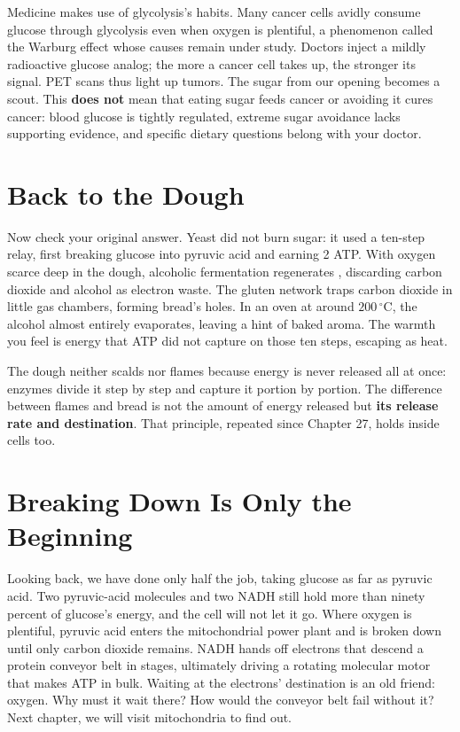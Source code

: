 Medicine makes use of glycolysis's habits. Many cancer cells avidly consume glucose through glycolysis even when oxygen is plentiful, a phenomenon called the Warburg effect whose causes remain under study. Doctors inject a mildly radioactive glucose analog; the more a cancer cell takes up, the stronger its signal. PET scans thus light up tumors. The sugar from our opening becomes a scout. This \textbf{does not} mean that eating sugar feeds cancer or avoiding it cures cancer: blood glucose is tightly regulated, extreme sugar avoidance lacks supporting evidence, and specific dietary questions belong with your doctor.

\section{Back to the Dough}

Now check your original answer. Yeast did not burn sugar: it used a ten-step relay, first breaking glucose into pyruvic acid and earning 2 ATP. With oxygen scarce deep in the dough, alcoholic fermentation regenerates , discarding carbon dioxide and alcohol as electron waste. The gluten network traps carbon dioxide in little gas chambers, forming bread's holes. In an oven at around $200\,^{\circ}\mathrm{C}$, the alcohol almost entirely evaporates, leaving a hint of baked aroma. The warmth you feel is energy that ATP did not capture on those ten steps, escaping as heat.

The dough neither scalds nor flames because energy is never released all at once: enzymes divide it step by step and capture it portion by portion. The difference between flames and bread is not the amount of energy released but \textbf{its release rate and destination}. That principle, repeated since Chapter 27, holds inside cells too.

\section{Breaking Down Is Only the Beginning}

Looking back, we have done only half the job, taking glucose as far as pyruvic acid. Two pyruvic-acid molecules and two NADH still hold more than ninety percent of glucose's energy, and the cell will not let it go. Where oxygen is plentiful, pyruvic acid enters the mitochondrial power plant and is broken down until only carbon dioxide remains. NADH hands off electrons that descend a protein conveyor belt in stages, ultimately driving a rotating molecular motor that makes ATP in bulk. Waiting at the electrons' destination is an old friend: oxygen. Why must it wait there? How would the conveyor belt fail without it? Next chapter, we will visit mitochondria to find out.

